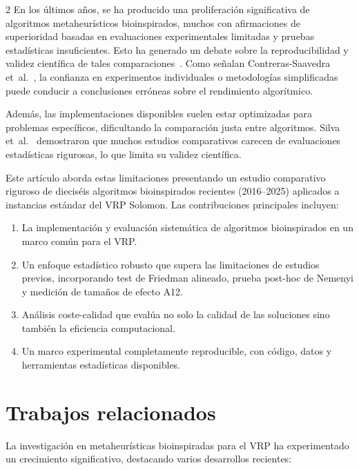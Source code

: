 \documentclass[10pt,a4paper]{extarticle}
\begin{document}
{\begin{multicols}{2}
En los últimos años, se ha producido una proliferación significativa de algoritmos metaheurísticos bioinspirados, muchos con afirmaciones de superioridad basadas en evaluaciones experimentales limitadas y pruebas estadísticas insuficientes. Esto ha generado un debate sobre la reproducibilidad y validez científica de tales comparaciones~\cite{Li2020SMA}. Como señalan Contreras-Saavedra et~al.~\cite{Contreras2024CD}, la confianza en experimentos individuales o metodologías simplificadas puede conducir a conclusiones erróneas sobre el rendimiento algorítmico.

Además, las implementaciones disponibles suelen estar optimizadas para problemas específicos, dificultando la comparación justa entre algoritmos. Silva et~al.~\cite{Silva2023VRP} demostraron que muchos estudios comparativos carecen de evaluaciones estadísticas rigurosas, lo que limita su validez científica.

Este artículo aborda estas limitaciones presentando un estudio comparativo riguroso de dieciséis algoritmos bioinspirados recientes (2016--2025) aplicados a instancias estándar del VRP Solomon. Las contribuciones principales incluyen:

\begin{enumerate}
\item La implementación y evaluación sistemática de algoritmos bioinspirados en un marco común para el VRP.
\item Un enfoque estadístico robusto que supera las limitaciones de estudios previos, incorporando test de Friedman alineado, prueba post-hoc de Nemenyi y medición de tamaños de efecto A12.
\item Análisis coste-calidad que evalúa no solo la calidad de las soluciones sino también la eficiencia computacional.
\item Un marco experimental completamente reproducible, con código, datos y herramientas estadísticas disponibles.
\end{enumerate}

\section{Trabajos relacionados}
La investigación en metaheurísticas bioinspiradas para el VRP ha experimentado un crecimiento significativo, destacando varios desarrollos recientes:


\end{multicols}}
\end{document}
